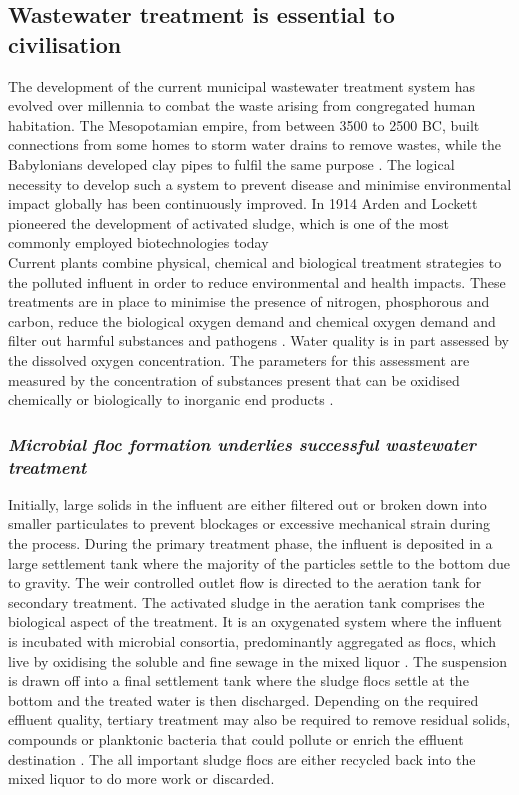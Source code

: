 \documentclass[twoside]{article}
\begin{document}
\subsection{Wastewater treatment is essential to civilisation}
The development of the current municipal wastewater treatment system has evolved over millennia to combat the waste arising from congregated human habitation. The Mesopotamian empire, from between 3500 to 2500 BC, built connections from some homes to storm water drains to remove wastes, while the Babylonians developed clay pipes to fulfil the same purpose \cite{lofrano2010}. The logical necessity to develop such a system to prevent disease and minimise environmental impact globally has been continuously improved. In 1914 Arden and Lockett pioneered the development of activated sludge, which is one of the most commonly employed biotechnologies today \cite{jenkins2004manual,muchie2010bioremediation}\\


Current plants combine physical, chemical and biological treatment strategies to the polluted influent in order to reduce environmental and health impacts. These treatments are in place to minimise the presence of nitrogen, phosphorous and carbon, reduce the biological oxygen demand and chemical oxygen demand and filter out harmful substances and pathogens \cite{mayhew1997low}.
Water quality is in part assessed by the dissolved oxygen concentration. The parameters for this assessment are measured by the concentration of substances present that can be oxidised chemically or biologically to inorganic end products \cite{pisarevsky2005chemical}.

\subsubsection{\emph{Microbial floc formation underlies successful wastewater treatment}}
Initially, large solids in the influent are either filtered out or broken down into smaller particulates to prevent blockages or excessive mechanical strain during the process. During the primary treatment phase, the influent is deposited in a large settlement tank where the majority of the particles settle to the bottom due to gravity. The weir controlled outlet flow is directed to the aeration tank for secondary treatment. The activated sludge in the aeration tank comprises the biological aspect of the treatment. It is an oxygenated system where the influent is incubated with microbial consortia, predominantly aggregated as flocs, which live by oxidising the soluble and fine sewage in the mixed liquor \cite{mayhew1997low}. The suspension is drawn off into a final settlement tank where the sludge flocs settle at the bottom and the treated water is then discharged. Depending on the required effluent quality, tertiary treatment may also be required to remove residual solids, compounds or planktonic bacteria that could pollute or enrich the effluent destination \cite{Price_95}. The all important sludge flocs are either recycled back into the mixed liquor to do more work or discarded.\\
\end{document}
